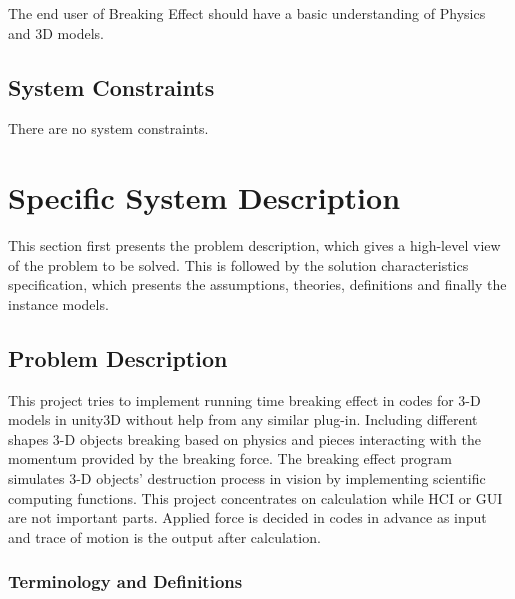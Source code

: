 \documentclass[12pt]{article}
\newcommand{\progname}{Breaking Effect} %
\begin{document}
	The end user of \progname{} should have a basic understanding of Physics and 3D
	models. 
	
	\subsection{System Constraints}
	
	There are no system constraints.  
	
	\section{Specific System Description}
	
	This section first presents the problem description, which gives a high-level
	view of the problem to be solved.  This is followed by the solution characteristics
	specification, which presents the assumptions, theories, definitions and finally
	the instance models. 
	
	\subsection{Problem Description} \label{Sec_pd}
	
	This project tries to implement running time breaking effect in codes for 3-D models in unity3D without help from any similar plug-in. Including different shapes 3-D objects breaking based on physics and pieces interacting with the momentum provided by the breaking force. The breaking effect program simulates 3-D objects’ destruction process in vision by implementing scientific computing functions. This project concentrates on calculation while HCI or GUI are not important parts. Applied force is decided in codes in advance as input and trace of motion is the output after calculation.
	
	\subsubsection{Terminology and  Definitions}
	
\end{document}
